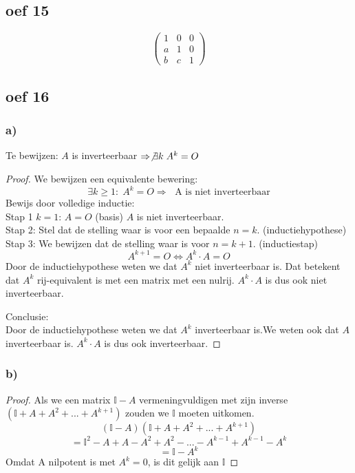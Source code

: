 \documentclass[lineaire_algebra_oplossingen.tex]{subfiles}
\begin{document}
\subsection{oef 15}
\[
\begin{pmatrix}
1 & 0 & 0\\
a & 1 & 0\\
b & c & 1
\end{pmatrix}
\]

\subsection{oef 16}
\subsubsection*{a)}
Te bewijzen: $A$ is inverteerbaar $\Rightarrow \not \exists k\; A^k=O$ 
\begin{proof}
We bewijzen een equivalente bewering:
\[
\exists k\ge 1:\;A^k=O \Rightarrow\; \text{ A is niet inverteerbaar}
\]
Bewijs door volledige inductie:\\
Stap 1 $k=1$: $A=O$ (basis)
$A$ is niet inverteerbaar.\\
Stap 2: Stel dat de stelling waar is voor een bepaalde $n=k$. (inductiehypothese)\\

Stap 3: We bewijzen dat de stelling waar is voor $n=k+1$. (inductiestap)\\
\[ A^{k+1}=O \Leftrightarrow A^{k}\cdot A=O \]
Door de inductiehypothese weten we dat $A^{k}$ niet inverteerbaar is. Dat betekent dat $A^{k}$ rij-equivalent is met een matrix met een nulrij. $A^{k} \cdot A$ is dus ook niet inverteerbaar.

Conclusie:\\
Door de inductiehypothese weten we dat $A^{k}$ inverteerbaar is.We weten ook dat $A$ inverteerbaar is. $A^{k} \cdot A$ is dus ook inverteerbaar.

\end{proof}

\subsubsection*{b)}
\begin{proof}
Als we een matrix $\mathbb{I}-A$ vermeningvuldigen met zijn inverse $(\mathbb{I}+A+A^2+...+A^{k+1})$ zouden we $\mathbb{I}$ moeten uitkomen.
\[ (\mathbb{I}-A)(\mathbb{I}+A+A^2+...+A^{k+1}) \]
\[ = \mathbb{I}^{2} -A+A-A^{2}+A^{2}-...-A^{k-1}+A^{k-1}-A^{k}\]
\[ = \mathbb{I}-A^{k}\]
Omdat A nilpotent is met $A^k=0$, is dit gelijk aan $\mathbb{I}$
\end{proof}
\end{document}
